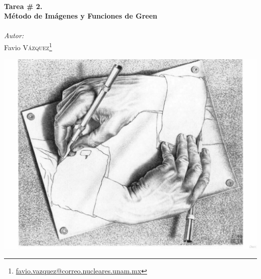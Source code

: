 \documentclass[a4paper,11pt]{article}
\numberwithin{equation}{section}
\begin{document}
\begin{titlepage}

\HRule \\[0.4cm]
{ \huge \bfseries Tarea \# 2. \\ Método de Imágenes y Funciones de 
Green}\\[0.2cm] %
\HRule \\[0.2cm]
 
\setcounter{footnote}{0}
\center
\large
\emph{Autor:} \\ %
\Large Favio \textsc{Vázquez}\footnote[1]{\href{mailto:favio.vazquez@correo.nucleares.unam.mx}{favio.vazquez@correo.nucleares.unam.mx}}


\includegraphics[scale=0.41]{handsEscher}


\vfill %

\end{titlepage}
\end{document}
